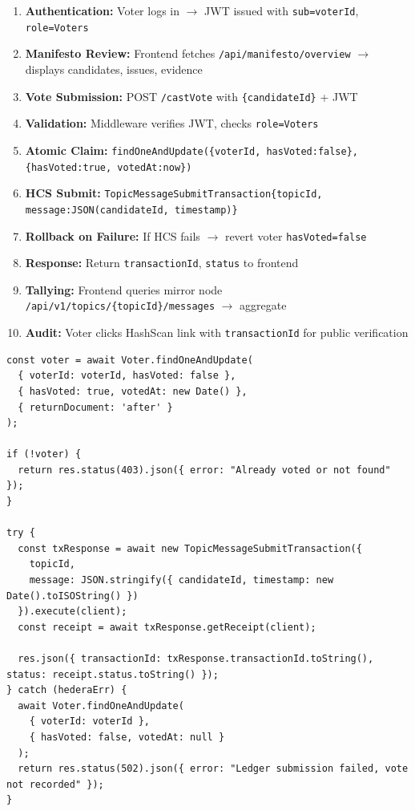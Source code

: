 \begin{enumerate}
    \item \textbf{Authentication:} Voter logs in $\rightarrow$ JWT issued with \texttt{sub=voterId}, \texttt{role=Voters}
    \item \textbf{Manifesto Review:} Frontend fetches \texttt{/api/manifesto/overview} $\rightarrow$ displays candidates, issues, evidence
    \item \textbf{Vote Submission:} POST \texttt{/castVote} with \texttt{\{candidateId\}} + JWT
    \item \textbf{Validation:} Middleware verifies JWT, checks \texttt{role=Voters}
    \item \textbf{Atomic Claim:} \texttt{findOneAndUpdate(\{voterId, hasVoted:false\}, \{hasVoted:true, votedAt:now\})}
    \item \textbf{HCS Submit:} \texttt{TopicMessageSubmitTransaction\{topicId, message:JSON(candidateId, timestamp)\}}
    \item \textbf{Rollback on Failure:} If HCS fails $\rightarrow$ revert voter \texttt{hasVoted=false}
    \item \textbf{Response:} Return \texttt{transactionId}, \texttt{status} to frontend
    \item \textbf{Tallying:} Frontend queries mirror node \texttt{/api/v1/topics/\{topicId\}/messages} $\rightarrow$ aggregate
    \item \textbf{Audit:} Voter clicks HashScan link with \texttt{transactionId} for public verification
\end{enumerate}

\begin{lstlisting}[style=codeStyle, caption=Atomic vote claim with HCS rollback, label=lst:vote-atomic]
const voter = await Voter.findOneAndUpdate(
  { voterId: voterId, hasVoted: false },
  { hasVoted: true, votedAt: new Date() },
  { returnDocument: 'after' }
);

if (!voter) {
  return res.status(403).json({ error: "Already voted or not found" });
}

try {
  const txResponse = await new TopicMessageSubmitTransaction({
    topicId,
    message: JSON.stringify({ candidateId, timestamp: new Date().toISOString() })
  }).execute(client);
  const receipt = await txResponse.getReceipt(client);

  res.json({ transactionId: txResponse.transactionId.toString(), status: receipt.status.toString() });
} catch (hederaErr) {
  await Voter.findOneAndUpdate(
    { voterId: voterId },
    { hasVoted: false, votedAt: null }
  );
  return res.status(502).json({ error: "Ledger submission failed, vote not recorded" });
}
\end{lstlisting}

